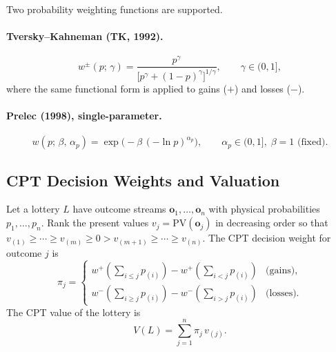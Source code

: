 \documentclass[12pt, a4paper]{article}
\begin{document}
Two probability weighting functions are supported.

\paragraph{Tversky--Kahneman (TK, 1992).}
\begin{equation}
  w^{\pm}(p;\, \gamma) = \frac{p^{\gamma}}{\bigl[p^{\gamma} + (1-p)^{\gamma}\bigr]^{1/\gamma}},
  \qquad \gamma \in (0, 1],
  \label{eq:pw_tk}
\end{equation}
where the same functional form is applied to gains ($+$) and losses ($-$).

\paragraph{Prelec (1998), single-parameter.}
\begin{equation}
  w(p;\, \beta,\, \alpha_p) = \exp\!\bigl(-\beta\,(-\ln p)^{\alpha_p}\bigr),
  \qquad \alpha_p \in (0, 1],\; \beta = 1 \text{ (fixed)}.
  \label{eq:pw_prelec}
\end{equation}

\subsection{CPT Decision Weights and Valuation}
\label{sec:cpt_value}

Let a lottery $L$ have outcome streams $\mathbf{o}_1, \ldots, \mathbf{o}_n$
with physical probabilities $p_1, \ldots, p_n$.  Rank the present values
$v_j = \mathrm{PV}(\mathbf{o}_j)$ in decreasing order so that
$v_{(1)} \geq \cdots \geq v_{(m)} \geq 0 > v_{(m+1)} \geq \cdots \geq v_{(n)}$.
The CPT decision weight for outcome $j$ is
\begin{equation}
  \pi_j =
  \begin{cases}
    w^+\!\left(\displaystyle\sum_{i\leq j} p_{(i)}\right)
    - w^+\!\left(\displaystyle\sum_{i< j}  p_{(i)}\right) & \text{(gains)}, \\[10pt]
    w^-\!\left(\displaystyle\sum_{i\geq j} p_{(i)}\right)
    - w^-\!\left(\displaystyle\sum_{i > j} p_{(i)}\right) & \text{(losses)}.
  \end{cases}
  \label{eq:dw}
\end{equation}
The CPT value of the lottery is
\begin{equation}
  V(L) = \sum_{j=1}^{n} \pi_j\, v_{(j)}.
  \label{eq:cpt_value}
\end{equation}
\end{document}
